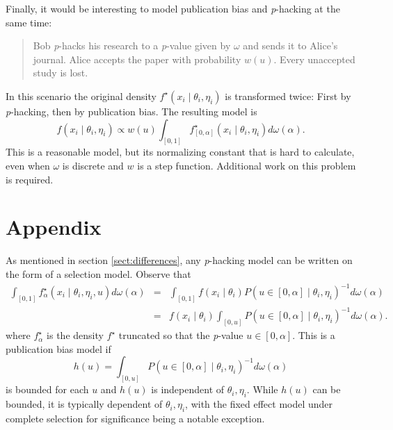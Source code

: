 \documentclass{article}
\theoremstyle{plain}
\theoremstyle{definition}
\begin{document}
Finally, it would be interesting to model publication bias and \textit{p}-hacking at the same time:
\begin{quote}
Bob \textit{p}-hacks his research to a \textit{p}-value given by $\omega$ and sends it to Alice's journal. Alice accepts the paper with probability $w\left(u\right)$. Every unaccepted study is lost.
\end{quote}
In this scenario the original density $f^{\star}\left(x_{i}\mid\theta_{i},\eta_{i}\right)$ is transformed twice: First by \textit{p}-hacking, then by publication bias. The resulting model is $$f\left(x_{i}\mid\theta_{i},\eta_{i}\right)\propto w\left(u\right)\int_{[0,1]}f_{[0,\alpha]}^{\star}\left(x_{i}\mid\theta_{i},\eta_{i}\right)d\omega\left(\alpha\right).$$ This is a reasonable model, but its normalizing constant that is hard to calculate, even when $\omega$ is discrete and $w$ is a step function. Additional work on this problem is required.

\section*{Appendix}
As mentioned in section \ref{sect:differences}, any \textit{p}-hacking model can be written on the form of a selection model. Observe that
\begin{eqnarray*}
\int_{[0,1]}f_\alpha^{\star}\left(x_{i}\mid\theta_{i},\eta_{i}, u\right)d\omega\left(\alpha\right) & = & \int_{[0,1]}f\left(x_{i}\mid\theta_{i}\right)P\left(u\in\left[0,\alpha\right]\mid\theta_{i},\eta_{i}\right)^{-1}d\omega\left(\alpha\right)\\
 & = & f\left(x_{i}\mid\theta_{i}\right)\int_{[0,u]}P\left(u\in\left[0,\alpha\right]\mid\theta_{i},\eta_{i}\right)^{-1}d\omega\left(\alpha\right).
\end{eqnarray*}
where $f_\alpha^{\star}$ is the density $f^{\star}$ truncated so that the \textit{p}-value $u\in\left[0,\alpha\right]$. This is a publication bias model if $$h\left(u\right)=\int_{[0,u]}P\left(u\in\left[0,\alpha\right]\mid\theta_{i},\eta_{i}\right)^{-1}d\omega\left(\alpha\right)$$ is bounded for each $u$ and $h\left(u\right)$ is independent of $\theta_{i},\eta_{i}$. While $h\left(u\right)$ can be bounded, it is typically dependent of $\theta_{i},\eta_{i}$, with the fixed effect model under complete selection for significance being a notable exception.
\end{document}

